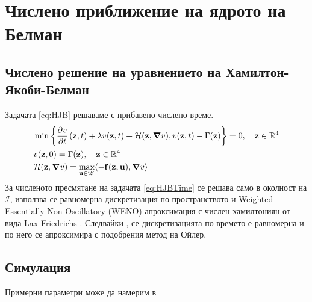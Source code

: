 \section{Числено приближение на ядрото на Белман}
\subsection{Числено решение на уравнението на Хамилтон-Якоби-Белман}
Задачата \eqref{eq:HJB} решаваме с прибавено числено време.
\begin{equation}
  \label{eq:HJBTime}
  \begin{split}
    &\min\left\{\pdv{v}{t}\left(\mathbf{z}, t\right) + \lambda v(\mathbf{z}, t) + \mathcal{H}(\mathbf{z}, \grad{v}), v(\mathbf{z}, t) - \Gamma(\mathbf{z})\right\} = 0, \quad \mathbf{z} \in \mathbb{R}^4 \\
    &v(\mathbf{z}, 0) = \Gamma(\mathbf{z}), \quad \mathbf{z} \in \mathbb{R}^4 \\
    &\mathcal{H}(\mathbf{z}, \grad{v}) = \max_{\mathbf{u} \in \mathscr{U}} \langle -\mathbf{f}(\mathbf{z}, \mathbf{u}), \grad{v} \rangle
  \end{split}
\end{equation}
За численото пресмятане на задачата \eqref{eq:HJBTime} се решава само в околност на $\mathscr{I}$, използва се равномерна дискретизация по пространството и Weighted Essentially Non-Oscillatory (WENO) \cite[глава~3.4]{Osher2003} апроксимация с числен хамилтониян от вида Lax-Friedrichs \cite[глава~5.3]{Osher2003}
. Следвайки \cite[глава~3.5]{Osher2003}, се дискретизацията по времето е равномерна и по него се апроксимира с подобрения метод на Ойлер.

\subsection{Симулация}
Примерни параметри може да намерим в \cite{Agusto2021}
